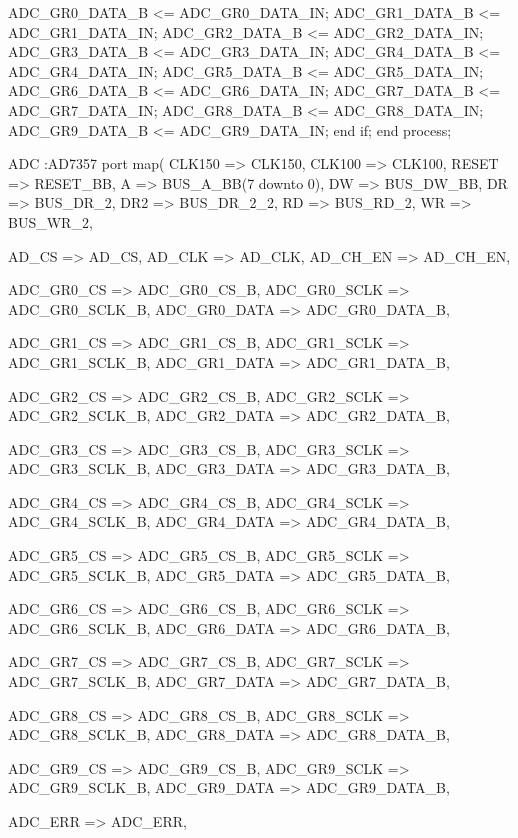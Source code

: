 \begin{mylisting}[language=VHDL,caption=トップモジュール,label=appF_Top_module_VHDL]
{{{			ADC_GR0_DATA_B	<= ADC_GR0_DATA_IN;
			ADC_GR1_DATA_B	<= ADC_GR1_DATA_IN;
			ADC_GR2_DATA_B	<= ADC_GR2_DATA_IN;
			ADC_GR3_DATA_B	<= ADC_GR3_DATA_IN;
			ADC_GR4_DATA_B	<= ADC_GR4_DATA_IN;
			ADC_GR5_DATA_B	<= ADC_GR5_DATA_IN;
			ADC_GR6_DATA_B	<= ADC_GR6_DATA_IN;
			ADC_GR7_DATA_B	<= ADC_GR7_DATA_IN;
			ADC_GR8_DATA_B	<= ADC_GR8_DATA_IN;
			ADC_GR9_DATA_B	<= ADC_GR9_DATA_IN;
		end if;
	end process;

	ADC :AD7357
		port map(
			CLK150		=> CLK150,
			CLK100		=> CLK100,
			RESET		=> RESET_BB,
			A			=> BUS_A_BB(7 downto 0),
			DW			=> BUS_DW_BB,
			DR			=> BUS_DR_2,
			DR2			=> BUS_DR_2_2,
			RD			=> BUS_RD_2,
			WR			=> BUS_WR_2,
			
			AD_CS		=> AD_CS,
			AD_CLK		=> AD_CLK,
			AD_CH_EN	=> AD_CH_EN,
			
			ADC_GR0_CS		=> ADC_GR0_CS_B,
			ADC_GR0_SCLK	=> ADC_GR0_SCLK_B,
			ADC_GR0_DATA	=> ADC_GR0_DATA_B,

			ADC_GR1_CS		=> ADC_GR1_CS_B,
			ADC_GR1_SCLK	=> ADC_GR1_SCLK_B,
			ADC_GR1_DATA	=> ADC_GR1_DATA_B,

			ADC_GR2_CS		=> ADC_GR2_CS_B,
			ADC_GR2_SCLK	=> ADC_GR2_SCLK_B,
			ADC_GR2_DATA	=> ADC_GR2_DATA_B,

			ADC_GR3_CS		=> ADC_GR3_CS_B,
			ADC_GR3_SCLK	=> ADC_GR3_SCLK_B,
			ADC_GR3_DATA	=> ADC_GR3_DATA_B,

			ADC_GR4_CS		=> ADC_GR4_CS_B,
			ADC_GR4_SCLK	=> ADC_GR4_SCLK_B,
			ADC_GR4_DATA	=> ADC_GR4_DATA_B,

			ADC_GR5_CS		=> ADC_GR5_CS_B,
			ADC_GR5_SCLK	=> ADC_GR5_SCLK_B,
			ADC_GR5_DATA	=> ADC_GR5_DATA_B,

			ADC_GR6_CS		=> ADC_GR6_CS_B,
			ADC_GR6_SCLK	=> ADC_GR6_SCLK_B,
			ADC_GR6_DATA	=> ADC_GR6_DATA_B,

			ADC_GR7_CS		=> ADC_GR7_CS_B,
			ADC_GR7_SCLK	=> ADC_GR7_SCLK_B,
			ADC_GR7_DATA	=> ADC_GR7_DATA_B,

			ADC_GR8_CS		=> ADC_GR8_CS_B,
			ADC_GR8_SCLK	=> ADC_GR8_SCLK_B,
			ADC_GR8_DATA	=> ADC_GR8_DATA_B,

			ADC_GR9_CS		=> ADC_GR9_CS_B,
			ADC_GR9_SCLK	=> ADC_GR9_SCLK_B,
			ADC_GR9_DATA	=> ADC_GR9_DATA_B,
			
			ADC_ERR			=> ADC_ERR,
			
}}}
\end{mylisting}
